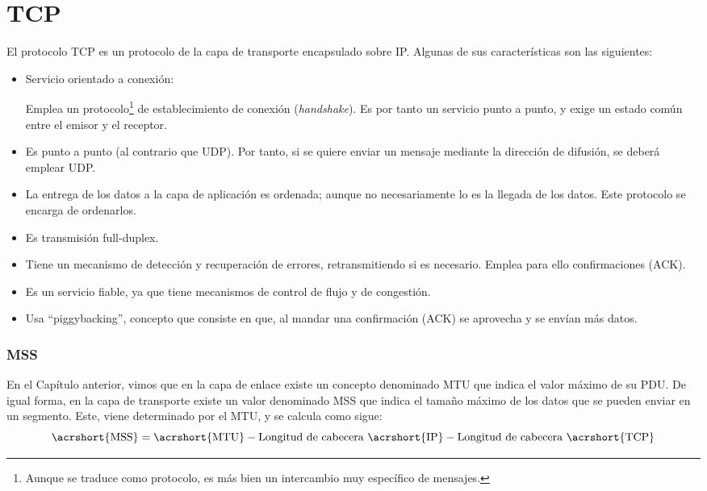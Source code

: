 \section{\acrfull{TCP}}
El protocolo \acrshort{TCP} es un protocolo de la capa de transporte encapsulado sobre \acrshort{IP}. Algunas de sus características son las siguientes:
\begin{itemize}
    \item Servicio orientado a conexión:
    
    Emplea un protocolo\footnote{Aunque se traduce como protocolo, es más bien un intercambio muy específico de mensajes.} de establecimiento de conexión (\textit{handshake}). Es por tanto un servicio punto a punto, y exige un estado común entre el emisor y el receptor. 
    
    \item Es punto a punto (al contrario que \acrshort{UDP}). Por tanto, si se quiere enviar un mensaje mediante la dirección de difusión, se deberá emplear \acrshort{UDP}.
    
    \item La entrega de los datos a la capa de aplicación es ordenada; aunque no necesariamente lo es la llegada de los datos. Este protocolo se encarga de ordenarlos.
    \item Es transmisión full-duplex.
    \item Tiene un mecanismo de detección y recuperación de errores, retransmitiendo si es necesario. Emplea para ello confirmaciones (\acrshort{ACK}).
    \item Es un servicio fiable, ya que tiene mecanismos de control de flujo y de congestión.
    \item Usa ``piggybacking'', concepto que consiste en que, al mandar una confirmación (\acrshort{ACK}) se aprovecha y se envían más datos.
\end{itemize}


\subsubsection{\acrfull{MSS}}

En el Capítulo anterior, vimos que en la capa de enlace existe un concepto denominado \acrshort{MTU} que indica el valor máximo de su \acrshort{PDU}. De igual forma, en la capa de transporte existe un valor denominado \acrshort{MSS} que indica el tamaño máximo de los datos que se pueden enviar en un segmento. Este, viene determinado por el \acrshort{MTU}, y se calcula como sigue:
\begin{equation*}
    \text{\acrshort{MSS}} = \text{\acrshort{MTU}} - \text{Longitud de cabecera \acrshort{IP}} - \text{Longitud de cabecera \acrshort{TCP}}
\end{equation*}

